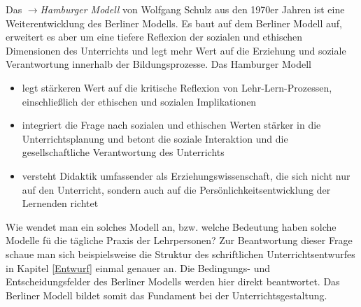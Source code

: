 Das $\to$\emph{Hamburger Modell} von Wolfgang Schulz aus den 1970er Jahren ist eine Weiterentwicklung des Berliner Modells. Es baut auf dem Berliner Modell auf, erweitert es aber um eine tiefere Reflexion der sozialen und ethischen Dimensionen des Unterrichts und legt mehr Wert auf die Erziehung und soziale Verantwortung innerhalb der Bildungsprozesse. Das Hamburger Modell



\begin{itemize}

	\item  legt st\"{a}rkeren Wert auf die kritische Reflexion von Lehr-Lern-Prozessen, einschlie{\ss}lich der ethischen und sozialen Implikationen

	\item integriert die Frage nach sozialen und ethischen Werten st\"{a}rker in die Unterrichtsplanung und betont die soziale Interaktion und die gesellschaftliche Verantwortung des Unterrichts

	\item versteht Didaktik umfassender als Erziehungswissenschaft, die sich nicht nur auf den Unterricht, sondern auch auf die Pers\"{o}nlichkeitsentwicklung der Lernenden richtet

\end{itemize}



Wie wendet man ein solches Modell an, bzw. welche Bedeutung haben solche Modelle f\"{u} die t\"{a}gliche Praxis der Lehrpersonen? Zur Beantwortung dieser Frage schaue man sich beispielsweise die Struktur des schriftlichen Unterrichtsentwurfes in Kapitel \ref{Entwurf} einmal genauer an. Die Bedingungs- und Entscheidungsfelder des Berliner Modells werden hier direkt beantwortet. Das Berliner Modell bildet somit das Fundament bei der Unterrichtsgestaltung.





